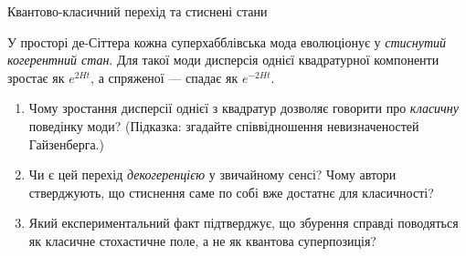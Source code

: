 \begin{problem}{Квантово-класичний перехід та стиснені стани}

У просторі де-Сіттера кожна суперхабблівська мода еволюціонує у \emph{стиснутий
когерентний стан}. Для такої моди дисперсія однієї квадратурної компоненти
зростає як $e^{2Ht}$, а спряженої — спадає як $e^{-2Ht}$.

\begin{enumerate}
    \item Чому зростання дисперсії однієї з квадратур дозволяє говорити про
          \emph{класичну} поведінку моди? (Підказка: згадайте співвідношення
          невизначеностей Гайзенберга.)
    \item Чи є цей перехід \emph{декогеренцією} у звичайному сенсі? Чому автори
          \cite{polarski_starobinsky_1996} стверджують, що стиснення саме по собі
          вже достатнє для класичності?
    \item Який експериментальний факт підтверджує, що збурення справді поводяться
          як класичне стохастичне поле, а не як квантова суперпозиція?
\end{enumerate}
\end{problem}